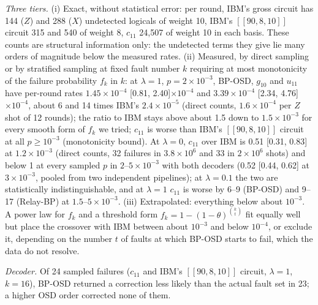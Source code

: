 \documentclass[aps,prl,twocolumn,superscriptaddress,nofootinbib]{revtex4-2}
\newcommand{\code}[1]{[[#1]]}
\begin{document}
\emph{Three tiers.} (i) Exact, without statistical error: per round, IBM's gross circuit has
144 ($Z$) and 288 ($X$) undetected logicals of weight 10, IBM's $\code{90,8,10}$ circuit 315
and 540 of weight 8, $c_{11}$ 24,507 of weight 10 in each basis. These counts are structural
information only: the undetected terms they give lie many orders of magnitude below the
measured rates. (ii) Measured, by direct sampling or by stratified sampling at fixed fault
number $k$ requiring at most monotonicity of the failure probability $f_k$ in $k$: at
$\lambda=1$, $p=2\times10^{-3}$, BP-OSD, $g_{10}$ and $u_{11}$ have per-round rates
$1.45\times10^{-4}$ [0.81, 2.40]$\times10^{-4}$ and $3.39\times10^{-4}$ [2.34,
4.76]$\times10^{-4}$, about 6 and 14 times IBM's $2.4\times10^{-5}$ (direct counts, $1.6\times10^{-4}$ per $Z$ shot of 12 rounds); the ratio to IBM stays above about 1.5 down to
$1.5\times10^{-3}$ for every smooth form of $f_k$ we tried; $c_{11}$ is worse than IBM's
$\code{90,8,10}$ circuit at all $p\ge10^{-3}$ (monotonicity bound). At $\lambda=0$, $c_{11}$
over IBM is 0.51 [0.31, 0.83] at $1.2\times10^{-3}$ (direct counts, 32 failures in
$3.8\times10^6$ and 33 in $2\times10^6$ shots) and below 1 at every sampled $p$ in
$2$--$5\times10^{-3}$ with both decoders (0.52 [0.44, 0.62] at $3\times10^{-3}$, pooled from
two independent pipelines); at $\lambda=0.1$ the two are statistically indistinguishable,
and at $\lambda=1$ $c_{11}$ is worse by 6--9 (BP-OSD) and 9--17 (Relay-BP) at
$1.5$--$5\times10^{-3}$. (iii) Extrapolated: everything below about $10^{-3}$. A power law
for $f_k$ and a threshold form $f_k=1-(1-\theta)^{\binom{k}{t}}$ fit equally well but place
the crossover with IBM between about $10^{-3}$ and below $10^{-4}$, or exclude it, depending
on the number $t$ of faults at which BP-OSD starts to fail, which the data do not resolve.

\emph{Decoder.} Of 24 sampled failures ($c_{11}$ and IBM's $\code{90,8,10}$ circuit,
$\lambda=1$, $k=16$), BP-OSD returned a correction less likely than the actual fault set in
23; a higher OSD order corrected none of them.

\end{document}
